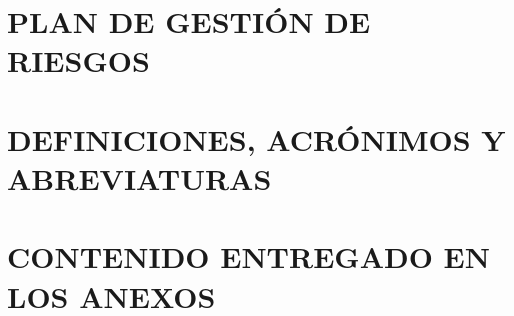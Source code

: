 \label{anexo:plan_de_gestion_de_riesgos}
\section*{PLAN DE GESTIÓN DE RIESGOS}


\newpage
\section*{DEFINICIONES, ACRÓNIMOS Y ABREVIATURAS}
{}


\newpage
\section*{CONTENIDO ENTREGADO EN LOS ANEXOS} 
